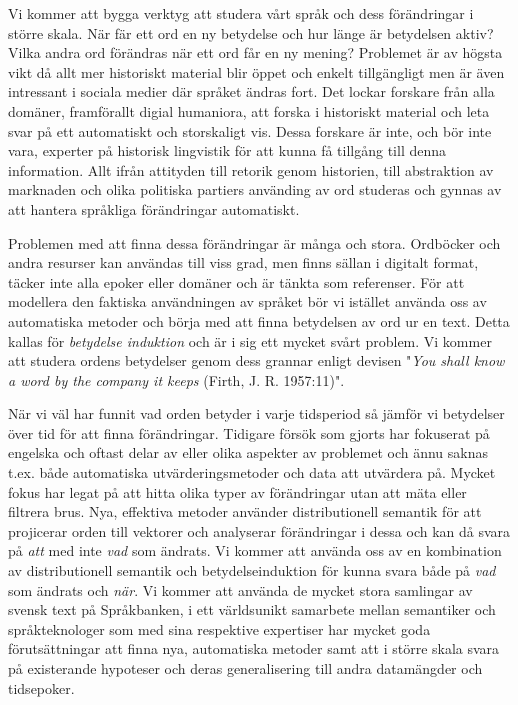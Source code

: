 \documentclass[11pt,twoside,a4paper]{article}
\begin{document}
Vi kommer att bygga verktyg att studera vårt språk och dess förändringar i större skala. När fär ett ord en ny betydelse och hur länge är  betydelsen aktiv? Vilka andra ord förändras när ett ord får en ny mening?
%
Problemet är av högsta vikt då allt mer historiskt material blir öppet och enkelt tillgängligt men är även intressant i sociala medier där språket ändras fort. Det lockar forskare från alla domäner, framförallt digial humaniora, att forska i historiskt material och leta svar på ett automatiskt och storskaligt vis. Dessa forskare är inte, och bör inte vara, experter på historisk lingvistik för att kunna få tillgång till denna information. Allt ifrån attityden till retorik genom historien, till abstraktion av marknaden och olika politiska partiers använding av ord studeras och gynnas av att hantera språkliga förändringar automatiskt. %

Problemen med att finna dessa förändringar är många och stora. Ordböcker och andra resurser kan användas till viss grad, men finns sällan i digitalt format, täcker inte alla epoker eller domäner och är tänkta som referenser. För att modellera den faktiska användningen av språket bör vi istället använda oss av automatiska metoder och börja med att finna betydelsen av ord ur en text. Detta kallas för \textit{betydelse induktion} och är i sig ett mycket svårt problem. Vi kommer att studera ordens betydelser genom dess grannar enligt devisen "\textit{You shall know a word by the company it keeps} (Firth, J. R. 1957:11)".

När vi väl har funnit vad orden betyder i varje tidsperiod så jämför vi betydelser över tid för att finna förändringar. Tidigare försök som gjorts har fokuserat på engelska och oftast delar av eller olika aspekter av problemet och ännu saknas t.ex. både automatiska utvärderingsmetoder och data att utvärdera på. Mycket fokus har legat på att hitta olika typer av förändringar utan att mäta eller filtrera brus. Nya, effektiva metoder använder distributionell semantik för att projicerar orden till vektorer och analyserar förändringar i dessa och kan då svara på \textit{att} med inte \textit{vad} som ändrats. Vi kommer att använda oss av en kombination av distributionell semantik och betydelseinduktion för kunna svara både på \textit{vad} som ändrats och \textit{när}. Vi kommer att använda de mycket stora samlingar av svensk text på Språkbanken, i ett världsunikt samarbete mellan semantiker och språkteknologer som med sina respektive expertiser har mycket goda förutsättningar att finna nya, automatiska metoder samt att i större skala svara på existerande hypoteser och deras generalisering till andra datamängder och tidsepoker. 
\end{document}
